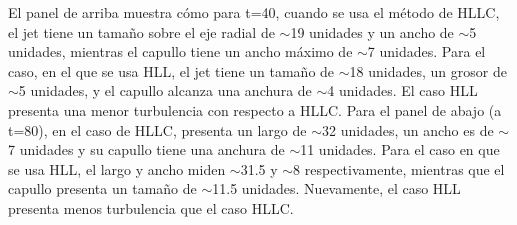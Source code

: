 \documentclass[12pt,a4paper]{book}
\begin{document}
El panel de arriba muestra cómo para t=40, cuando se usa el método de HLLC, el jet tiene un tamaño sobre el eje radial de $\sim$19 unidades y un ancho de $\sim$5 unidades, mientras el capullo tiene un 
ancho máximo de $\sim$7 unidades. Para el caso, en el que se usa HLL, el jet tiene un tamaño de $\sim$18 unidades, un grosor de $\sim$5 unidades, y el capullo alcanza una anchura de $\sim$4 unidades. El caso HLL presenta 
una menor turbulencia con respecto a HLLC.
Para el panel de abajo (a t=80), en el caso de HLLC, presenta un largo de $\sim$32 unidades, un ancho es de $\sim$7 unidades y su capullo tiene una anchura de $\sim$11 unidades. Para el caso en que se usa HLL, el largo 
y ancho miden $\sim$31.5 y $\sim$8 respectivamente, mientras que el capullo presenta un tamaño de $\sim$11.5 unidades. Nuevamente, el caso HLL presenta menos turbulencia que el caso HLLC.
\end{document}
